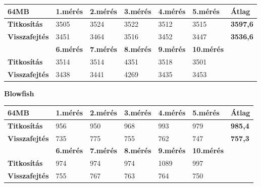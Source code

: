 \begin{center}
	
	
	\begin{tabular}{|p{2.4cm}|p{1.6cm}|p{1.6cm}|p{1.7cm}|p{1.7cm}|p{1.8cm}|p{1.5cm}|}
		\hline
		\textbf{64MB} & \textbf{1.mérés} & \textbf{2.mérés} & \textbf{3.mérés} & \textbf{4.mérés} & \textbf{5.mérés} & \textbf{Átlag} \\
		\hline
		\textbf{Titkosítás}&3505&3524&3522&3512&3515&\textbf{3597,6}\\
		\hline
		\textbf{Visszafejtés}&3451&3464&3516&3452&3447&\textbf{3536,6} \\
		\hline
		& \textbf{6.mérés} & \textbf{7.mérés} & \textbf{8.mérés} & \textbf{9.mérés} & \textbf{10.mérés} & \\
		\hline
		\textbf{Titkosítás}&3514&3514&4351&3518&3501&\\
		\hline
		\textbf{Visszafejtés}&3438&3441&4269&3435&3453&\\
		\hline
	\end{tabular}
\end{center}

\noindent \textbf{Blowfish}

\begin{center}
	
	
	\begin{tabular}{|p{2.4cm}|p{1.7cm}|p{1.7cm}|p{1.7cm}|p{1.7cm}|p{1.8cm}|p{1.2cm}|}
		\hline
		\textbf{64MB} & \textbf{1.mérés} & \textbf{2.mérés} & \textbf{3.mérés} & \textbf{4.mérés} & \textbf{5.mérés} & \textbf{Átlag} \\
		\hline
		\textbf{Titkosítás}&956&950&968&993&979&\textbf{985,4} \\
		\hline
		\textbf{Visszafejtés}&735&775&755&762&747&\textbf{757,3} \\
		\hline
		& \textbf{6.mérés} & \textbf{7.mérés} & \textbf{8.mérés} & \textbf{9.mérés} & \textbf{10.mérés} & \\
		\hline
		\textbf{Titkosítás}&974&974&974&1089&997&\\
		\hline
		\textbf{Visszafejtés}&755&767&763&764&750&\\
		\hline
	\end{tabular}
\end{center}


